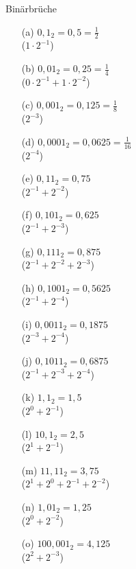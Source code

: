 \begin{exercise}{Binärbrüche}
\begin{solution}
\begin{center}
\begin{minipage}{0.3\textwidth}
\begin{itemize}
\item[(a)] $0{,}1_2 = 0{,}5 = \frac{1}{2}$        \\ ($1 \cdot 2^{-1}$)
\item[(b)] $0{,}01_2 = 0{,}25 = \frac{1}{4}$      \\ ($0 \cdot 2^{-1} + 1\cdot 2^{-2}$)
\item[(c)] $0{,}001_2 = 0{,}125 = \frac{1}{8}$    \\ ($2^{-3}$)
\item[(d)] $0{,}0001_2 = 0{,}0625 = \frac{1}{16}$ \\ ($2^{-4}$)
\item[(e)] $0{,}11_2 = 0{,}75$                    \\ ($2^{-1} + 2^{-2}$)
\end{itemize}
\end{minipage}
\begin{minipage}{0.3\textwidth}
\begin{itemize}
\item[(f)] $0{,}101_2 = 0{,}625$   \\ ($2^{-1} + 2^{-3}$)
\item[(g)] $0{,}111_2 = 0{,}875$   \\ ($2^{-1} + 2^{-2} + 2^{-3}$)
\item[(h)] $0{,}1001_2 = 0{,}5625$ \\ ($2^{-1} + 2^{-4}$)
\item[(i)] $0{,}0011_2 = 0{,}1875$ \\ ($2^{-3} + 2^{-4}$) 
\item[(j)] $0{,}1011_2 = 0{,}6875$ \\ ($2^{-1} + 2^{-3} + 2^{-4}$)
\end{itemize}
\end{minipage}
\begin{minipage}{0.3\textwidth}
\begin{itemize}
\item[(k)] $1{,}1_2 = 1{,}5$       \\ ($2^0 + 2^{-1}$)
\item[(l)] $10{,}1_2 = 2{,}5$      \\ ($2^1 + 2^{-1}$)
\item[(m)] $11{,}11_2 = 3{,}75$    \\ ($2^1 + 2^0 + 2^{-1} + 2^{-2}$)
\item[(n)] $1{,}01_2 = 1{,}25$     \\ ($2^0 + 2^{-2}$)
\item[(o)] $100{,}001_2 = 4{,}125$ \\ ($2^2 + 2^{-3}$)
\end{itemize}
\end{minipage}
\end{center}
\end{solution}

\end{exercise}

